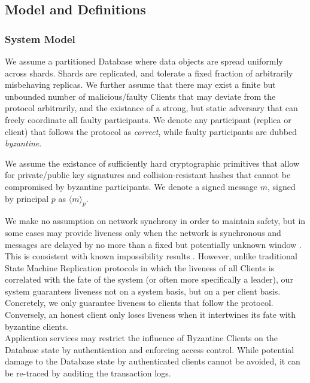 \subsection{Model and Definitions}

\subsubsection{System Model}
We assume a partitioned Database where data objects are spread uniformly across shards. Shards are replicated, and tolerate a fixed fraction of arbitrarily misbehaving replicas. We further assume that there may exist a finite but unbounded number of malicious/faulty Clients that may deviate from the protocol arbitrarily, and the existance of a strong, but static adversary that can freely coordinate all faulty participants. We denote any participant (replica or client) that follows the protocol as \textit{correct}, while faulty participants are dubbed \textit{byzantine}.  
 
We assume the existance of sufficiently hard cryptographic primitives that allow for private/public key signatures and collision-resistant hashes that cannot be compromised by byzantine participants. We denote a signed message $m$, signed by principal $p$ as $\langle m \rangle_p$. 
 
We make no assumption on network synchrony in order to maintain safety, but in some cases may provide liveness  only when the network is synchronous and messages are delayed by no more than a fixed but potentially unknown window . This is consistent with known impossibility results \cite{fischer1985impossibility}.
However, unlike traditional State Machine Replication protocols in which the liveness of all Clients is correlated with the fate of the system (or often more specifically a leader), our system guarantees liveness not on a system basis, but on a per client basis. Concretely, we only guarantee liveness to clients that follow the protocol. Conversely, an honest client only loses liveness when it intertwines its fate with byzantine clients.\\

Application services may restrict the influence of Byzantine Clients on the Database state by authentication and enforcing access control. While potential damage to the Database state by authenticated clients cannot be avoided, it can be re-traced by auditing the transaction logs.\\



